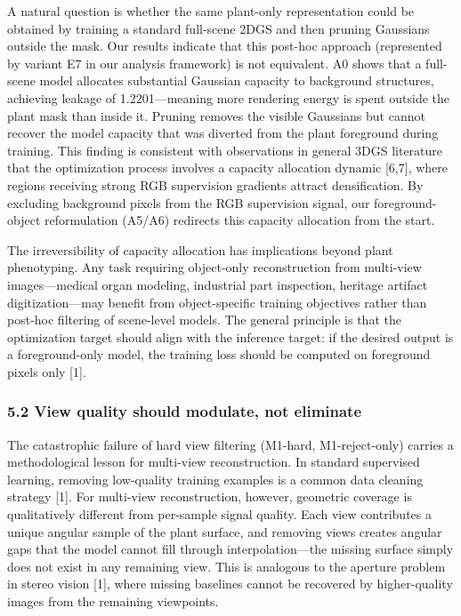 \documentclass[11pt,a4paper]{article}
\begin{document}
A natural question is whether the same plant-only representation could
be obtained by training a standard full-scene 2DGS and then pruning
Gaussians outside the mask. Our results indicate that this post-hoc
approach (represented by variant E7 in our analysis framework) is not
equivalent. A0 shows that a full-scene model allocates substantial
Gaussian capacity to background structures, achieving leakage of
1.2201---meaning more rendering energy is spent outside the plant mask
than inside it. Pruning removes the visible Gaussians but cannot recover
the model capacity that was diverted from the plant foreground during
training. This finding is consistent with observations in general 3DGS
literature that the optimization process involves a capacity allocation
dynamic {[}6,7{]}, where regions receiving strong RGB supervision
gradients attract densification. By excluding background pixels from the
RGB supervision signal, our foreground-object reformulation (A5/A6)
redirects this capacity allocation from the start.

The irreversibility of capacity allocation has implications beyond plant
phenotyping. Any task requiring object-only reconstruction from
multi-view images---medical organ modeling, industrial part inspection,
heritage artifact digitization---may benefit from object-specific
training objectives rather than post-hoc filtering of scene-level
models. The general principle is that the optimization target should
align with the inference target: if the desired output is a
foreground-only model, the training loss should be computed on
foreground pixels only {[}1{]}.

\subsubsection{5.2 View quality should modulate, not
eliminate}\label{view-quality-should-modulate-not-eliminate}

The catastrophic failure of hard view filtering (M1-hard,
M1-reject-only) carries a methodological lesson for multi-view
reconstruction. In standard supervised learning, removing low-quality
training examples is a common data cleaning strategy {[}1{]}. For
multi-view reconstruction, however, geometric coverage is qualitatively
different from per-sample signal quality. Each view contributes a unique
angular sample of the plant surface, and removing views creates angular
gaps that the model cannot fill through interpolation---the missing
surface simply does not exist in any remaining view. This is analogous
to the aperture problem in stereo vision {[}1{]}, where missing
baselines cannot be recovered by higher-quality images from the
remaining viewpoints.
\end{document}

